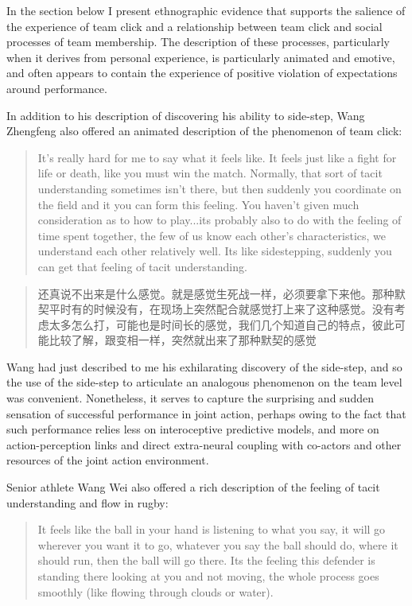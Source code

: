 \begin{CJK}{UTF8}{gbsn}
In the section below I present ethnographic evidence that supports the salience of the experience of team click and a relationship between team click and social processes of team membership.  The description of these processes, particularly when it derives from personal experience, is particularly animated and emotive, and often appears to contain the experience of positive violation of expectations around performance.

In addition to his description of discovering his ability to side-step, Wang Zhengfeng also offered an animated description of the phenomenon of team click:

  \begin{quotation}
    It’s really hard for me to say what it feels like.  It feels just like a fight for life or death, like you must win the match.  Normally, that sort of tacit understanding sometimes isn’t there, but then suddenly you coordinate on the field and it you can form this feeling. You haven't given much consideration as to how to play...its probably also to do with the feeling of time spent together, the few of us know each other’s characteristics, we understand each other relatively well.  Its like sidestepping, suddenly you can get that feeling of tacit understanding.
  \end{quotation}

  \begin{quotation}
    还真说不出来是什么感觉。就是感觉生死战一样，必须要拿下来他。那种默契平时有的时候没有，在现场上突然配合就感觉打上来了这种感觉。没有考虑太多怎么打，可能也是时间长的感觉，我们几个知道自己的特点，彼此可能比较了解，跟变相一样，突然就出来了那种默契的感觉 
  \end{quotation}

Wang had just described to me his exhilarating discovery of the side-step, and so the use of the side-step to articulate an analogous phenomenon on the team level was convenient.  Nonetheless, it serves to capture the surprising and sudden sensation of successful performance in joint action, perhaps owing to the fact that such performance relies less on interoceptive predictive models, and more on action-perception links and direct extra-neural coupling with co-actors and other resources of the joint action environment.

Senior athlete Wang Wei also offered a rich description of the feeling of tacit understanding and flow in rugby:

  \begin{quotation}
    It feels like the ball in your hand is listening to what you say, it will go wherever you want it to go, whatever you say the ball should do, where it should run, then the ball will go there.  Its the feeling this defender is standing there looking at you and not moving, the whole process goes smoothly (like flowing through clouds or water).
  \end{quotation}


\end{CJK}

